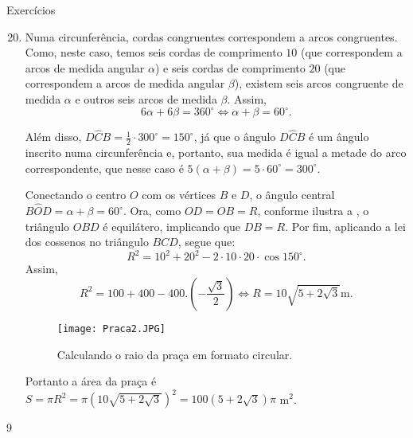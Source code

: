 \begin{answer}{Exercícios}
{\exerciselist
\begin{enumerate}\setcounter{enumi}{19}
\item Numa circunferência, cordas congruentes correspondem a arcos congruentes. Como, neste caso, temos seis cordas de comprimento $10$ (que correspondem a arcos de medida angular $\alpha$) e seis cordas de comprimento $20$ (que correspondem a arcos de medida angular $\beta$), existem seis arcos congruente de medida $\alpha$ e outros seis arcos de medida $\beta$. Assim,
    $$6\alpha+6\beta=360^\circ \iff \alpha+\beta=60^\circ.$$
   
    Além disso, $D\hat{C}B=\frac{1}{2}\cdot 300^\circ=150^\circ$, já que o ângulo $D\hat{C}B$ é um ângulo inscrito numa circunferência e, portanto, sua medida é igual a metade do arco correspondente, que nesse caso é $5(\alpha+\beta)=5\cdot60^\circ=300^\circ$.
    
    Conectando o centro $O$ com os vértices $B$ e $D$, o ângulo central $B\hat{O}D=\alpha+\beta=60^\circ$. Ora, como $OD=OB=R$, conforme ilustra a , o triângulo $OBD$ é equilátero, implicando que $DB=R$. Por fim, aplicando a lei dos cossenos no triângulo $BCD$, segue que:
    $$R^2=10^2+20^2-2\cdot10\cdot20\cdot\cos150^\circ.$$
    Assim, 
    $$R^2=100+400-400.\left(-\frac{\sqrt{3}}{2}\right) \iff R=10\sqrt{5+2\sqrt{3}} \text{m}.$$
     \begin{figure}[H]
    \centering
    \texttt{[image: Praca2.JPG]}
    \caption{Calculando o raio da praça em formato circular.}
    \label{praca2}
    \end{figure}
    
    Portanto a área da praça é $S=\pi R^2=\pi (10\sqrt{5+2\sqrt{3}})^2=100(5+2\sqrt{3})\pi$ m$^2$.
\end{enumerate}
}{9}
\end{answer}

